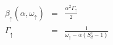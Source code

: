 \documentclass[reprint,prb,superscriptaddress]{revtex4-1}
\begin{document}





\begin{eqnarray}
\beta_{\uparrow} (\alpha,\omega_{\uparrow})&=& \frac{\alpha^2 \Gamma_{\uparrow}}{2} \nonumber\\
\Gamma_{\uparrow}&=& \frac{1}{\omega_{\uparrow}-\alpha(S_d^z-1)}
\end{eqnarray}
\end{document}
